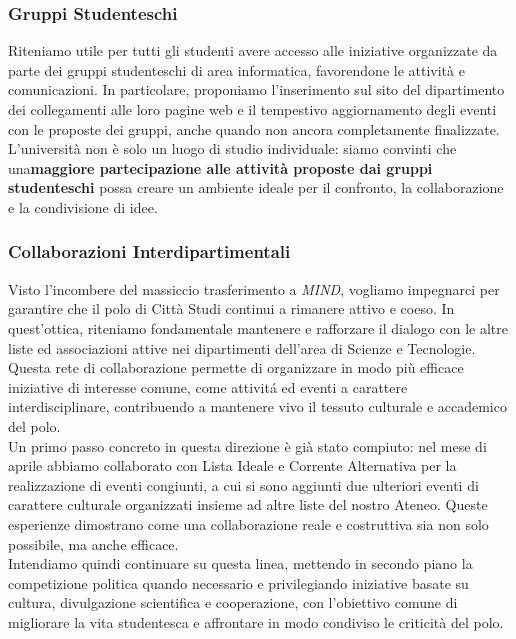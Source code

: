 \documentclass[12pt,a4paper]{article}
\begin{document}
\subsubsection{Gruppi Studenteschi}
Riteniamo utile per tutti gli studenti avere accesso alle iniziative organizzate da parte dei gruppi studenteschi di area informatica, favorendone le attività e comunicazioni.
In particolare, proponiamo l'inserimento sul sito del dipartimento dei collegamenti alle loro pagine web e il tempestivo aggiornamento degli eventi con le proposte dei gruppi, anche quando non ancora completamente finalizzate.
\\ L'università non è solo un luogo di studio individuale: siamo convinti che una\textbf{maggiore partecipazione alle attività proposte dai gruppi studenteschi} possa creare un ambiente ideale per il confronto, la collaborazione e la condivisione di idee.

\subsubsection{Collaborazioni Interdipartimentali}
Visto l'incombere del massiccio trasferimento a \textit{MIND}, vogliamo impegnarci per garantire che il polo di Città Studi continui a rimanere attivo e coeso. In quest’ottica, riteniamo fondamentale mantenere e rafforzare il dialogo con le altre liste ed associazioni attive nei dipartimenti dell’area di Scienze e Tecnologie.
\\ Questa rete di collaborazione permette di organizzare in modo più efficace iniziative di interesse comune, come attivitá ed eventi a carattere interdisciplinare, contribuendo a mantenere vivo il tessuto culturale e accademico del polo.
\\ Un primo passo concreto in questa direzione è già stato compiuto: nel mese di aprile abbiamo collaborato con Lista Ideale e Corrente Alternativa per la realizzazione di eventi congiunti, a cui si sono aggiunti due ulteriori eventi di carattere culturale organizzati insieme ad altre liste del nostro Ateneo. Queste esperienze dimostrano come una collaborazione reale e costruttiva sia non solo possibile, ma anche efficace.
\\ Intendiamo quindi continuare su questa linea, mettendo in secondo piano la competizione politica quando necessario e privilegiando iniziative basate su cultura, divulgazione scientifica e cooperazione, con l’obiettivo comune di migliorare la vita studentesca e affrontare in modo condiviso le criticità del polo.
\end{document}
